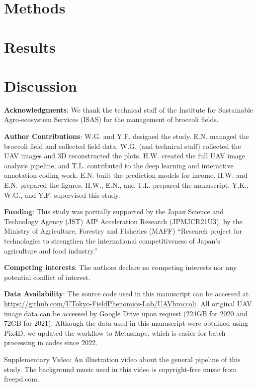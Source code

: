 \section{Methods}


\section{Results}


\section{Discussion}



\noindent \textbf{Acknowledgments}: We thank the technical staff of the Institute for Sustainable Agro-ecosystem Services (ISAS) for the management of broccoli fields. 

\hspace*{\fill}

\noindent \textbf{Author Contributions}: W.G. and Y.F. designed the study. E.N. managed the broccoli field and collected field data. W.G. (and technical staff) collected the UAV images and 3D reconstructed the plots. H.W. created the full UAV image analysis pipeline, and T.L. contributed to the deep learning and interactive annotation coding work. E.N. built the prediction models for income. H.W. and E.N. prepared the figures. H.W., E.N., and T.L. prepared the manuscript. Y.K., W.G., and Y.F. supervised this study.

\hspace*{\fill}

\noindent \textbf{Funding}: This study was partially supported by the Japan Science and Technology Agency (JST) AIP Acceleration Research (JPMJCR21U3), by the Ministry of Agriculture, Forestry and Fisheries (MAFF) “Research project for technologies to strengthen the international competitiveness of Japan's agriculture and food industry.”

\hspace*{\fill}

\noindent \textbf{Competing interests}: The authors declare no competing interests nor any potential conflict of interest.

\hspace*{\fill}

\noindent \textbf{Data Availability}: The source code used in this manuscript can be accessed at \url{https://github.com/UTokyo-FieldPhenomics-Lab/UAVbroccoli}. All original UAV image data can be accessed by Google Drive upon request (224GB for 2020 and 72GB for 2021). Although the data used in this manuscript were obtained using Pix4D, we updated the workflow to Metashape, which is easier for batch processing in codes since 2022.


\supplementarysection

Supplementary Video: An illustration video about the general pipeline of this study. The background music used in this video is copyright-free music from freepd.com.

